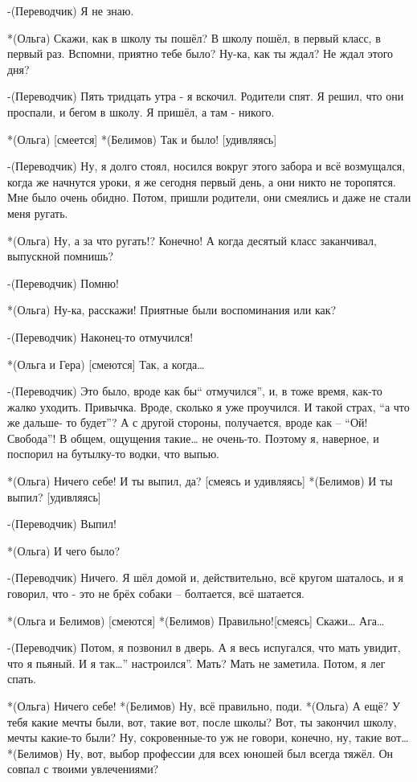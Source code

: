 -(Переводчик) Я не знаю.

*(Ольга) Скажи, как в школу ты пошёл? В школу пошёл, в первый класс, в первый раз. Вспомни, приятно тебе было? Ну-ка, как ты ждал? Не ждал этого дня?

-(Переводчик) Пять тридцать утра - я вскочил. Родители спят. Я решил, что они проспали, и бегом в школу. Я пришёл, а там - никого.

*(Ольга) [смеется]
*(Белимов) Так и было! [удивляясь]

-(Переводчик) Ну, я долго стоял, носился вокруг этого забора и всё возмущался, когда же начнутся уроки, я же сегодня первый день, а они никто не торопятся. Мне было очень обидно. Потом, пришли родители, они смеялись и даже не стали меня ругать.

*(Ольга) Ну, а за что ругать!? Конечно! А когда десятый класс заканчивал, выпускной помнишь?

-(Переводчик) Помню!

*(Ольга) Ну-ка, расскажи! Приятные были воспоминания или как? 

-(Переводчик) Наконец-то отмучился!

*(Ольга и Гера) [смеются] Так, а когда…

-(Переводчик) Это было, вроде как бы“ отмучился”, и, в тоже время, как-то жалко уходить. Привычка. Вроде, сколько я уже проучился. И такой страх, “а что же дальше- то будет”? А с другой стороны, получается, вроде как – “Ой! Свобода”! В общем, ощущения такие… не очень-то. Поэтому я, наверное, и поспорил на бутылку-то водки, что выпью.

*(Ольга) Ничего себе! И ты выпил, да? [смеясь и удивляясь]
*(Белимов) И ты выпил? [удивляясь]

-(Переводчик) Выпил!

*(Ольга) И чего было?

-(Переводчик) Ничего. Я шёл домой и, действительно, всё кругом шаталось, и я говорил, что - это не брёх собаки --  болтается, всё шатается.

*(Ольга и Белимов) [смеются]
*(Белимов) Правильно![смеясь] Скажи… Ага…

-(Переводчик) Потом, я позвонил в дверь. А я весь испугался, что мать увидит, что я пьяный. И я так…” настроился”. Мать? Мать не заметила. Потом, я лег спать.

*(Ольга) Ничего себе!
*(Белимов) Ну, всё правильно, поди.
*(Ольга) А ещё? У тебя какие мечты были, вот, такие вот, после школы? Вот, ты закончил школу, мечты какие-то были? Ну, сокровенные-то уж не говори, конечно, ну, такие вот…
*(Белимов) Ну, вот, выбор профессии для всех юношей был всегда тяжёл. Он совпал с твоими увлечениями?

